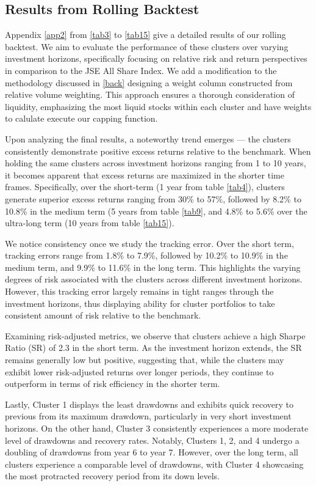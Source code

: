 \documentclass[11pt,preprint, authoryear]{elsarticle}
\numberwithin{equation}{section}
\numberwithin{figure}{section}
\numberwithin{table}{section}
\begin{document}
\hypertarget{results-from-rolling-backtest}{%
\subsection{Results from Rolling
Backtest}\label{results-from-rolling-backtest}}

Appendix \ref{app2} from \ref{tab3} to \ref{tab15} give a detailed
results of our rolling backtest. We aim to evaluate the performance of
these clusters over varying investment horizons, specifically focusing
on relative risk and return perspectives in comparison to the JSE All
Share Index. We add a modification to the methodology discussed in
\ref{back} designing a weight column constructed from relative volume
weighting. This approach ensures a thorough consideration of liquidity,
emphasizing the most liquid stocks within each cluster and have weights
to calulate execute our capping function.

Upon analyzing the final results, a noteworthy trend emerges --- the
clusters consistently demonstrate positive excess returns relative to
the benchmark. When holding the same clusters across investment horizons
ranging from 1 to 10 years, it becomes apparent that excess returns are
maximized in the shorter time frames. Specifically, over the short-term
(1 year from table \ref{tab4}), clusters generate superior excess
returns ranging from 30\% to 57\%, followed by 8.2\% to 10.8\% in the
medium term (5 years from table \ref{tab9}, and 4.8\% to 5.6\% over the
ultra-long term (10 years from table \ref{tab15}).

We notice consistency once we study the tracking error. Over the short
term, tracking errors range from 1.8\% to 7.9\%, followed by 10.2\% to
10.9\% in the medium term, and 9.9\% to 11.6\% in the long term. This
highlights the varying degrees of risk associated with the clusters
across different investment horizons. However, this tracking error
largely remains in tight ranges through the investment horizons, thus
displaying ability for cluster portfolios to take consistent amount of
risk relative to the benchmark.

Examining risk-adjusted metrics, we observe that clusters achieve a high
Sharpe Ratio (SR) of 2.3 in the short term. As the investment horizon
extends, the SR remains generally low but positive, suggesting that,
while the clusters may exhibit lower risk-adjusted returns over longer
periods, they continue to outperform in terms of risk efficiency in the
shorter term.

Lastly, Cluster 1 displays the least drawdowns and exhibits quick
recovery to previous from its maximum drawdown, particularly in very
short investment horizons. On the other hand, Cluster 3 consistently
experiences a more moderate level of drawdowns and recovery rates.
Notably, Clusters 1, 2, and 4 undergo a doubling of drawdowns from year
6 to year 7. However, over the long term, all clusters experience a
comparable level of drawdowns, with Cluster 4 showcasing the most
protracted recovery period from its down levels.
\end{document}
